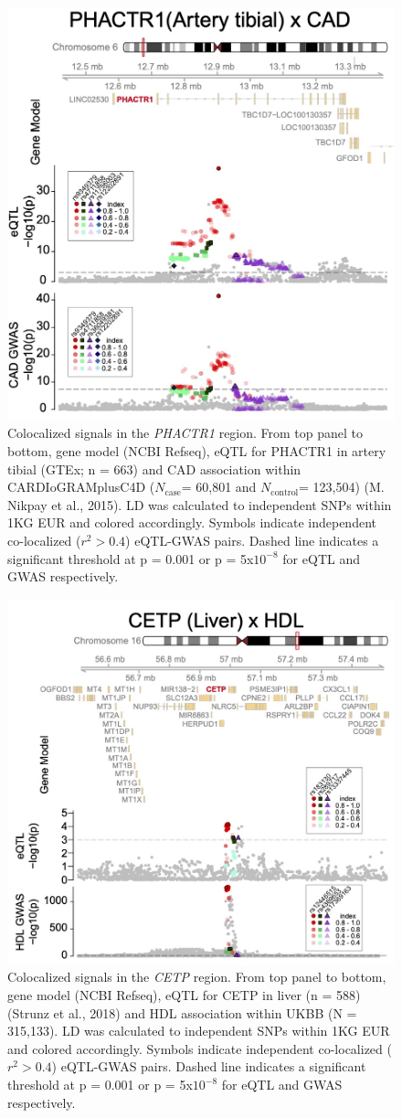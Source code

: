 \documentclass[11pt]{article}
\newcommand{\Ncase}{$N_{\textrm{case}}$\xspace}
\newcommand{\Ncontrol}{$N_{\textrm{control}}$\xspace}
\begin{document}
\begin{figure}[!ht]
  \centering
  \includegraphics[width=.7\textwidth]{figs/region_phactr1.jpg}
  \caption{Colocalized signals in the \emph{PHACTR1} region. From top
    panel to bottom, gene model (NCBI Refseq), eQTL for PHACTR1 in
    artery tibial (GTEx; n = 663) and CAD association within
    CARDIoGRAMplusC4D (\Ncase = 60,801 and \Ncontrol = 123,504)
    (M. Nikpay et al., 2015). LD was calculated to independent SNPs
    within 1KG EUR and colored accordingly. Symbols indicate
    independent co-localized ($r^2 > 0.4$) eQTL-GWAS pairs. Dashed
    line indicates a significant threshold at p = 0.001 or p =
    5x$10^{-8}$ for eQTL and GWAS respectively.} 
\end{figure}

\begin{figure}[!ht]
  \centering
  \includegraphics[width=.7\textwidth]{figs/region_cetp.jpg}
  \caption{Colocalized signals in the \emph{CETP} region. From top
    panel to bottom, gene model (NCBI Refseq), eQTL for CETP in liver
    (n = 588) (Strunz et al., 2018) and HDL association within UKBB (N
    = 315,133). LD was calculated to independent SNPs within 1KG EUR
    and colored accordingly. Symbols indicate independent co-localized
    ($r^2 > 0.4$) eQTL-GWAS pairs. Dashed line indicates a significant
    threshold at p = 0.001 or p = 5x$10^{-8}$ for eQTL and GWAS
    respectively.} 
\end{figure}
\end{document}
